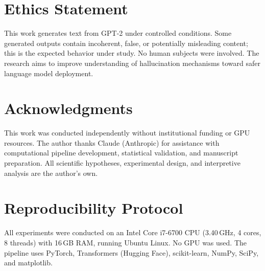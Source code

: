 \documentclass[11pt]{article}
\begin{document}

\section*{Ethics Statement}

This work generates text from GPT-2 under controlled conditions. Some generated outputs contain incoherent, false, or potentially misleading content; this is the expected behavior under study. No human subjects were involved. The research aims to improve understanding of hallucination mechanisms toward safer language model deployment.


\section*{Acknowledgments}

This work was conducted independently without institutional funding or GPU resources. The author thanks Claude (Anthropic) for assistance with computational pipeline development, statistical validation, and manuscript preparation. All scientific hypotheses, experimental design, and interpretive analysis are the author's own.





\appendix

\section{Reproducibility Protocol}
\label{sec:reproducibility}

All experiments were conducted on an Intel Core i7-6700 CPU (3.40\,GHz, 4 cores, 8 threads) with 16\,GB RAM, running Ubuntu Linux. No GPU was used. The pipeline uses PyTorch, Transformers (Hugging Face), scikit-learn, NumPy, SciPy, and matplotlib.
\end{document}

